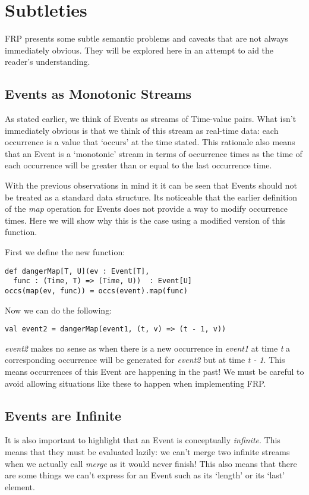   \section{Subtleties}
    \label{sec:subtle}
    FRP presents some subtle semantic problems and caveats that are not always immediately obvious.
    They will be explored here in an attempt to aid the reader's understanding.
     
    \subsection{Events as Monotonic Streams}
      As stated earlier, we think of Events as streams of Time-value pairs. What isn't immediately
      obvious is that we think of this stream as real-time data: each occurrence is a value that
      `occurs' at the time stated. This rationale also means that an Event is a `monotonic' stream in terms of
      occurrence times as the time of each occurrence will be greater than or equal to the last occurrence
      time.
      
      With the previous observations in mind it it can be seen that Events should not be treated as a
      standard data structure. Its noticeable that the earlier definition of the \emph{map} operation for
      Events does not provide a way to modify occurrence times. Here we will show why this is
      the case using a modified version of this function.
      
      First we define the new function:
      
\begin{verbatim}
def dangerMap[T, U](ev : Event[T], 
  func : (Time, T) => (Time, U))  : Event[U]
occs(map(ev, func)) = occs(event).map(func)
\end{verbatim}

      Now we can do the following:
      
\begin{verbatim}
val event2 = dangerMap(event1, (t, v) => (t - 1, v))
\end{verbatim}

      \emph{event2} makes no sense as when there is a new occurrence in \emph{event1} at time 
      \emph{t} a corresponding occurrence will be generated for \emph{event2} but at time 
      \emph{t - 1}. This means occurrences of this Event are happening in the past! We must
      be careful to avoid allowing situations like these to happen when implementing FRP.
      
    \subsection{Events are Infinite}  
      It is also important to highlight that an Event is conceptually \emph{infinite}. This means
      that they must be evaluated lazily: we can't merge two infinite streams when we actually
      call \emph{merge} as it would never finish! This also means that there are some things we
      can't express for an Event such as its `length' or its `last' element.
      
